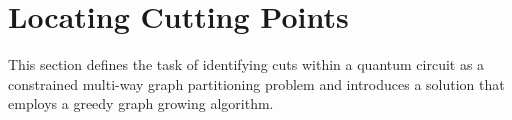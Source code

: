 \section{Locating Cutting Points}\label{sec:locate_cuts}
This section defines the task of identifying cuts within a quantum circuit as a constrained multi-way graph partitioning problem
and introduces a solution that employs a greedy graph growing algorithm.


